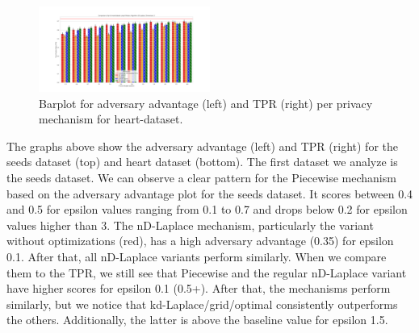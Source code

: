 {\begin{figure}[H]
\begin{minipage}[c]{1.1\textwidth}
      \includegraphics[width=0.50\textwidth]{Results/RQ2/heart-dataset/tpr_heart-dataset_comparison.png}
      \caption{Barplot for adversary advantage (left) and TPR (right) per privacy mechanism for heart-dataset.}
      \label{fig:privacy_heart-dataset_comparison_3d_aa_plot}
    \end{minipage}
  \end{figure}
  The graphs above show the adversary advantage (left) and TPR (right) for the seeds dataset (top) and heart dataset (bottom).
  The first dataset we analyze is the seeds dataset. We can observe a clear pattern for the Piecewise mechanism based on the adversary advantage plot for the seeds dataset. It scores between 0.4 and 0.5 for epsilon values ranging from 0.1 to 0.7 and drops below 0.2 for epsilon values higher than 3.
  The nD-Laplace mechanism, particularly the variant without optimizations (red), has a high adversary advantage (0.35) for epsilon 0.1. After that, all nD-Laplace variants perform similarly. When we compare them to the TPR, we still see that Piecewise and the regular nD-Laplace variant have higher scores for epsilon 0.1 (0.5+). After that, the mechanisms perform similarly, but we notice that kd-Laplace/grid/optimal consistently outperforms the others. Additionally, the latter is above the baseline value for epsilon 1.5.

}
